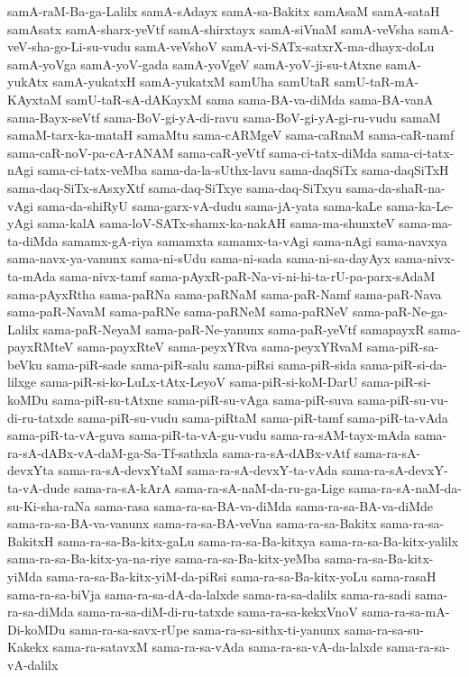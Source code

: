 {samA-raM-Ba-ga-Lalilx
samA-sAdayx
samA-sa-Bakitx
samAsaM
samA-sataH
samAsatx
samA-sharx-yeVtf
samA-shirxtayx
samA-siVnaM
samA-veVsha
samA-veV-sha-go-Li-su-vudu
samA-veVshoV
samA-vi-SATx-satxrX-ma-dhayx-doLu
samA-yoVga
samA-yoV-gada
samA-yoVgeV
samA-yoV-ji-su-tAtxne
samA-yukAtx
samA-yukatxH
samA-yukatxM
samUha
samUtaR
samU-taR-mA-KAyxtaM
samU-taR-sA-dAKayxM
sama
sama-BA-va-diMda
sama-BA-vanA
sama-Bayx-seVtf
sama-BoV-gi-yA-di-ravu
sama-BoV-gi-yA-gi-ru-vudu
samaM
samaM-tarx-ka-mataH
samaMtu
sama-cARMgeV
sama-caRnaM
sama-caR-namf
sama-caR-noV-pa-cA-rANAM
sama-caR-yeVtf
sama-ci-tatx-diMda
sama-ci-tatx-nAgi
sama-ci-tatx-veMba
sama-da-la-sUthx-lavu
sama-daqSiTx
sama-daqSiTxH
sama-daq-SiTx-sAsxyXtf
sama-daq-SiTxye
sama-daq-SiTxyu
sama-da-shaR-na-vAgi
sama-da-shiRyU
sama-garx-vA-dudu
sama-jA-yata
sama-kaLe
sama-ka-Le-yAgi
sama-kalA
sama-loV-SATx-shamx-ka-nakAH
sama-ma-shunxteV
sama-ma-ta-diMda
samamx-gA-riya
samamxta
samamx-ta-vAgi
sama-nAgi
sama-navxya
sama-navx-ya-vanunx
sama-ni-sUdu
sama-ni-sada
sama-ni-sa-dayAyx
sama-nivx-ta-mAda
sama-nivx-tamf
sama-pAyxR-paR-Na-vi-ni-hi-ta-rU-pa-parx-sAdaM
sama-pAyxRtha
sama-paRNa
sama-paRNaM
sama-paR-Namf
sama-paR-Nava
sama-paR-NavaM
sama-paRNe
sama-paRNeM
sama-paRNeV
sama-paR-Ne-ga-Lalilx
sama-paR-NeyaM
sama-paR-Ne-yanunx
sama-paR-yeVtf
samapayxR
sama-payxRMteV
sama-payxRteV
sama-peyxYRva
sama-peyxYRvaM
sama-piR-sa-beVku
sama-piR-sade
sama-piR-salu
sama-piRsi
sama-piR-sida
sama-piR-si-da-lilxge
sama-piR-si-ko-LuLx-tAtx-LeyoV
sama-piR-si-koM-DarU
sama-piR-si-koMDu
sama-piR-su-tAtxne
sama-piR-su-vAga
sama-piR-suva
sama-piR-su-vu-di-ru-tatxde
sama-piR-su-vudu
sama-piRtaM
sama-piR-tamf
sama-piR-ta-vAda
sama-piR-ta-vA-guva
sama-piR-ta-vA-gu-vudu
sama-ra-sAM-tayx-mAda
sama-ra-sA-dABx-vA-daM-ga-Sa-Tf-sathxla
sama-ra-sA-dABx-vAtf
sama-ra-sA-devxYta
sama-ra-sA-devxYtaM
sama-ra-sA-devxY-ta-vAda
sama-ra-sA-devxY-ta-vA-dude
sama-ra-sA-kArA
sama-ra-sA-naM-da-ru-ga-Lige
sama-ra-sA-naM-da-su-Ki-sha-raNa
sama-rasa
sama-ra-sa-BA-va-diMda
sama-ra-sa-BA-va-diMde
sama-ra-sa-BA-va-vanunx
sama-ra-sa-BA-veVna
sama-ra-sa-Bakitx
sama-ra-sa-BakitxH
sama-ra-sa-Ba-kitx-gaLu
sama-ra-sa-Ba-kitxya
sama-ra-sa-Ba-kitx-yalilx
sama-ra-sa-Ba-kitx-ya-na-riye
sama-ra-sa-Ba-kitx-yeMba
sama-ra-sa-Ba-kitx-yiMda
sama-ra-sa-Ba-kitx-yiM-da-piRsi
sama-ra-sa-Ba-kitx-yoLu
sama-rasaH
sama-ra-sa-biVja
sama-ra-sa-dA-da-lalxde
sama-ra-sa-dalilx
sama-ra-sadi
sama-ra-sa-diMda
sama-ra-sa-diM-di-ru-tatxde
sama-ra-sa-kekxVnoV
sama-ra-sa-mA-Di-koMDu
sama-ra-sa-savx-rUpe
sama-ra-sa-sithx-ti-yanunx
sama-ra-sa-su-Kakekx
sama-ra-satavxM
sama-ra-sa-vAda
sama-ra-sa-vA-da-lalxde
sama-ra-sa-vA-dalilx
}
